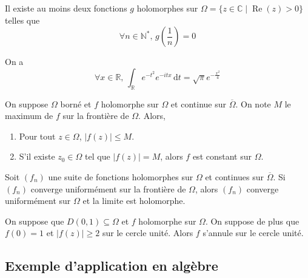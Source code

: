 	\begin{cexample}
		Il existe au moins deux fonctions $g$ holomorphes sur $\Omega = \{ z \in \mathbb{C} \mid \operatorname{Re}(z) > 0 \}$ telles que
		\[ \forall n \in \mathbb{N}^*, \, g\left( \frac{1}{n} \right) = 0 \]
	\end{cexample}


	\begin{application}
		On a
		\[ \forall x \in \mathbb{R}, \, \int_{\mathbb{R}} e^{-t^2} e^{-itx} \, \mathrm{d}t = \sqrt{\pi} e^{-\frac{x^2}{4}} \]
	\end{application}


	\begin{theorem}
		On suppose $\Omega$ borné et $f$ holomorphe sur $\Omega$ et continue sur $\overline{\Omega}$. On note $M$ le maximum de $f$ sur la frontière de $\Omega$. Alors,
		\begin{enumerate}[label=(\roman*)]
			\item Pour tout $z \in \Omega$, $\vert f(z) \vert \leq M$.
			\item S'il existe $z_0 \in \Omega$ tel que $\vert f(z) \vert = M$, alors $f$ est constant sur $\Omega$.
		\end{enumerate}
	\end{theorem}


	\begin{application}
		Soit $(f_n)$ une suite de fonctions holomorphes sur $\Omega$ et continues sur $\overline{\Omega}$. Si $(f_n)$ converge uniformément sur la frontière de $\Omega$, alors $(f_n)$ converge uniformément sur $\Omega$ et la limite est holomorphe.
	\end{application}

	\begin{application}
		On suppose que $D(0,1) \subseteq \Omega$ et $f$ holomorphe sur $\Omega$. On suppose de plus que $f(0) = 1$ et $\vert f(z) \vert \geq 2$ sur le cercle unité. Alors $f$ s'annule sur le cercle unité.
	\end{application}

	\subsection{Exemple d'application en algèbre}


